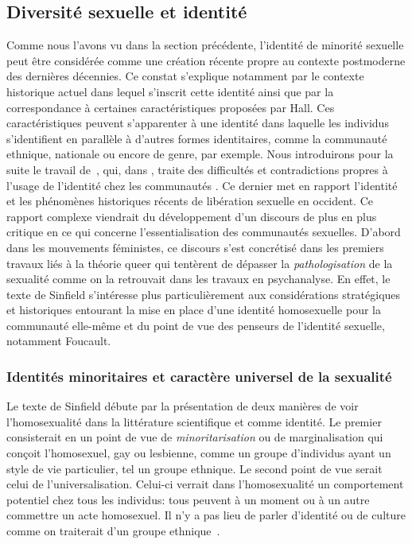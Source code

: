 \subsection{Diversité sexuelle et identité}
\label{sec:diversit_sexuelle_et_identit_} Comme nous l'avons vu dans la section précédente, l'identité de minorité sexuelle peut être considérée comme une création récente propre au contexte postmoderne des dernières décennies.
Ce constat s'explique notamment par le contexte historique actuel dans lequel s'inscrit cette identité ainsi que par la correspondance à certaines caractéristiques proposées par Hall.
Ces caractéristiques peuvent s'apparenter à une identité dans laquelle les individus s'identifient en parallèle à d'autres formes identitaires, comme la communauté ethnique, nationale ou encore de genre, par exemple.
Nous introduirons pour la suite le travail de~\citet{Sinfield1996}, qui, dans , traite des difficultés et contradictions propres à l'usage de l'identité chez les communautés \lgbt{}.
Ce dernier met en rapport l'identité et les phénomènes historiques récents de libération sexuelle en occident.
Ce rapport complexe viendrait du développement d'un discours de plus en plus critique en ce qui concerne l'essentialisation des communautés sexuelles.
D'abord dans les mouvements féministes, ce discours s'est concrétisé dans les premiers travaux liés à la théorie queer qui tentèrent de dépasser la \emph{pathologisation} de la sexualité comme on la retrouvait dans les travaux en psychanalyse.
En effet, le texte de Sinfield s'intéresse plus particulièrement aux considérations stratégiques et historiques entourant la mise en place d'une identité homosexuelle pour la communauté elle-même et du point de vue des penseurs de l'identité sexuelle, notamment Foucault.

\subsubsection{Identités minoritaires et caractère universel de la sexualité}
\label{sub:minorit_s_et_universel}
Le texte de Sinfield débute par la présentation de deux manières de voir l'homosexualité dans la littérature scientifique et comme identité.
Le premier consisterait en un point de vue de \emph{minoritarisation} ou de marginalisation qui conçoit l'homosexuel, gay ou lesbienne, comme un groupe d'individus ayant un style de vie particulier, tel un groupe ethnique.
Le second point de vue serait celui de l'universalisation.
Celui-ci verrait dans l'homosexualité un comportement potentiel chez tous les individus: tous peuvent à un moment ou à un autre commettre un acte homosexuel.
Il n'y a pas lieu de parler d'identité ou de culture comme on traiterait d'un groupe ethnique~\citep[271]{Sinfield1996}.

